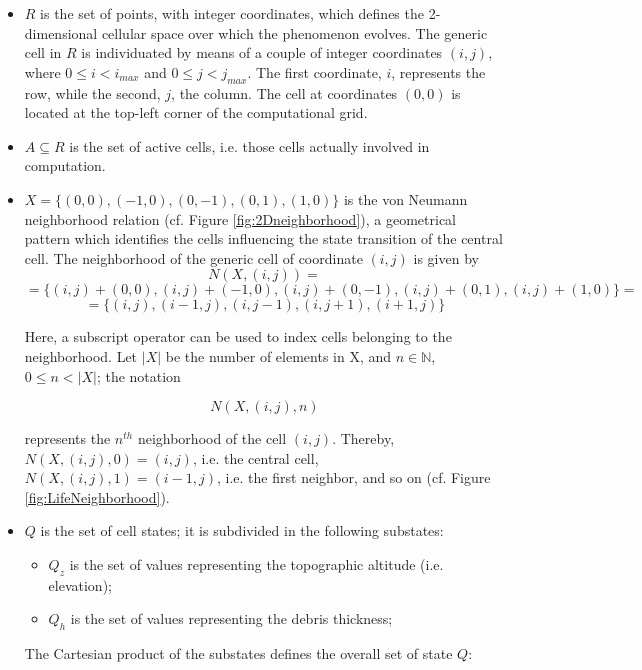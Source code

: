 \begin{itemize}

\item $R$ is the set of points, with integer coordinates, which
  defines the 2-dimensional cellular space over which the phenomenon
  evolves. The generic cell in $R$ is individuated by means of a
  couple of integer coordinates $(i, j)$, where $0 \leq i < i_{max}$
  and $0 \leq j < j_{max}$. The first coordinate, $i$, represents the
  row, while the second, $j$, the column. The cell at coordinates
  $(0,0)$ is located at the top-left corner of the computational grid.

\item $A \subseteq R$ is the set of active cells, i.e. those cells
  actually involved in computation.

\item $X = \{(0,0), (-1, 0), (0, -1), (0, 1), (1, 0)\}$ is the von
  Neumann neighborhood relation (cf. Figure \ref{fig:2Dneighborhood}),
  a geometrical pattern which identifies the cells influencing the
  state transition of the central cell. The neighborhood of the
  generic cell of coordinate $(i, j)$ is given by
$$N(X, (i, j)) =$$
$$= \{(i, j)+(0,0), (i, j)+(-1, 0), (i, j)+(0, -1),
(i, j)+(0, 1), (i, j)+(1, 0)\} =$$
$$= \{(i, j), (i-1, j), (i, j-1), (i, j+1), (i+1, j)\}$$

Here, a subscript operator can be used to index cells belonging to the
neighborhood. Let $|X|$ be the number of elements in X, and $n \in
\mathbb{N}$, $0 \leq n < |X|$; the notation

$$N(X, (i, j), n)$$

represents the $n^{th}$ neighborhood of the cell $(i,j)$. Thereby,
$N(X, (i, j), 0) = (i, j)$, i.e. the central cell, $N(X, (i, j), 1) =
(i-1, j)$, i.e. the first neighbor, and so on (cf. Figure
\ref{fig:LifeNeighborhood}).

\item $Q$ is the set of cell states; it is subdivided in the following
  substates:

\begin{itemize}
    \item   $Q_z$ is the set of values representing the topographic altitude (i.e. elevation);
    \item   $Q_h$ is the set of values representing the debris thickness;
\end{itemize}

The Cartesian product of the substates defines the overall set of
state $Q$:


\end{itemize}
